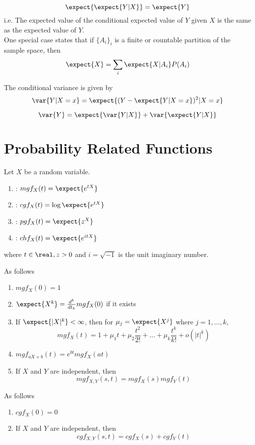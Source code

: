 \documentclass[11pt]{article}
\begin{document}
$$\expect{\expect{Y|X}} = \expect{Y}$$
i.e. The expected value of the conditional expected value of $Y$ given $X$ is the same as the expected value of $Y$. \\
One special case states that if $\{A_i\}_i$ is a finite or countable partition of the sample space, then
$$\expect{X} = \sum_i \expect{X|A_i}P(A_i)$$

The conditional variance is given by
$$\var{Y|X=x} = \expect{(Y - \expect{Y|X=x})^2|X=x}$$

\theorem
$$\var{Y} = \expect{\var{Y|X}} + \var{\expect{Y|X}}$$

\section{Probability Related Functions}
Let $X$ be a random variable. 
\begin{enumerate}
	\item  {}: $mgf_X(t) = \expect{e^{tX}}$
	\item  {}: $cgf_X(t) = \log\expect{e^{tX}}$
	\item  {}: $pgf_X(t) = \expect{z^{X}}$
    \item  {}: $chf_X(t) = \expect{e^{itX}}$ \\
\end{enumerate}
where $t \in \real, z > 0$ and $i = \sqrt{-1}$ is the unit imaginary number.

As follows
\begin{enumerate}
	\item $mgf_X(0) = 1$
	\item $\expect{X^k} = \frac{d^k}{dt_k} mgf_X(0)$ if it exists
	\item If $\expect{|X|^k} < \infty$, then for $\mu_j = \expect{X^j}$ where $j = 1, \hdots, k$, 
	$$mgf_X(t) = 1 + \mu_1t+ \mu_2\frac{t^2}{2!} + \hdots + \mu_k \frac{t^k}{k!} + o(|t|^k)$$
	\item $mgf_{aX+b}(t) = e^{bt}mgf_X(at)$
	\item If $X$ and $Y$ are independent, then $$mgf_{X,Y}(s,t) = mgf_X(s)mgf_Y(t)$$
\end{enumerate}

As follows
\begin{enumerate}
	\item $cgf_X(0) = 0$
	\item If $X$ and $Y$ are independent, then $$cgf_{X,Y}(s,t) = cgf_X(s) + cgf_Y(t)$$
\end{enumerate}
\end{document}
